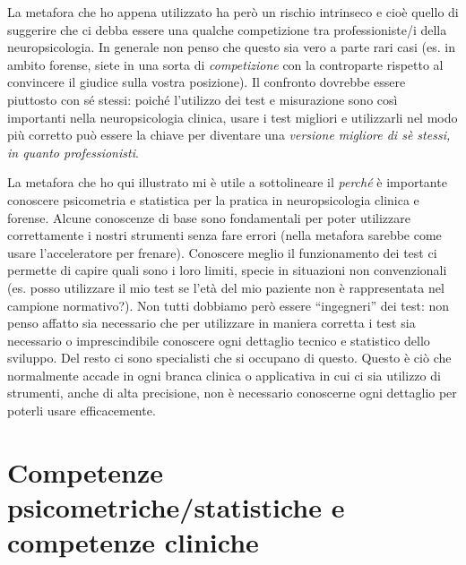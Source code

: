 \documentclass[
  italian,
  letterpaper,
  paper=6in:9in,
  pagesize=pdftex,
  headinclude=on,
  footinclude=on,
  11pt]{scrbook}
\begin{document}
La metafora che ho appena utilizzato ha però un rischio intrinseco e
cioè quello di suggerire che ci debba essere una qualche competizione
tra professioniste/i della neuropsicologia. In generale non penso che
questo sia vero a parte rari casi (es. in ambito forense, siete in una
sorta di \emph{competizione} con la controparte rispetto al convincere
il giudice sulla vostra posizione). Il confronto dovrebbe essere
piuttosto con sé stessi: poiché l'utilizzo dei test e misurazione sono
così importanti nella neuropsicologia clinica, usare i test migliori e
utilizzarli nel modo più corretto può essere la chiave per diventare una
\emph{versione migliore di sè stessi, in quanto professionisti}.

La metafora che ho qui illustrato mi è utile a sottolineare il
\emph{perché} è importante conoscere psicometria e statistica per la
pratica in neuropsicologia clinica e forense. Alcune conoscenze di base
sono fondamentali per poter utilizzare correttamente i nostri strumenti
senza fare errori (nella metafora sarebbe come usare l'acceleratore per
frenare). Conoscere meglio il funzionamento dei test ci permette di
capire quali sono i loro limiti, specie in situazioni non convenzionali
(es. posso utilizzare il mio test se l'età del mio paziente non è
rappresentata nel campione normativo?). Non tutti dobbiamo però essere
``ingegneri'' dei test: non penso affatto sia necessario che per
utilizzare in maniera corretta i test sia necessario o imprescindibile
conoscere ogni dettaglio tecnico e statistico dello sviluppo. Del resto
ci sono specialisti che si occupano di questo. Questo è ciò che
normalmente accade in ogni branca clinica o applicativa in cui ci sia
utilizzo di strumenti, anche di alta precisione, non è necessario
conoscerne ogni dettaglio per poterli usare efficacemente.

\section*{Competenze psicometriche/statistiche e competenze
cliniche}\label{competenze-psicometrichestatistiche-e-competenze-cliniche}

\end{document}
